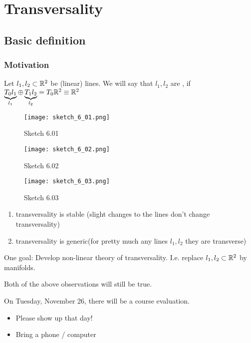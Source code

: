 \chapter{Transversality}

\section{Basic definition}

\subsection{Motivation}

Let \(l_1,l_2\subset\mathbb{R}^2\) be (linear) lines. We will say that \(l_1,l_2\) are , if 
\(\underbrace{T_0l_1}_{l_1} \oplus \underbrace{T_1l_2}_{l_2} = T_0\mathbb{R}^2\equiv \mathbb{R}^2\)
\begin{figure}[H]
    \centering
    \texttt{[image: sketch\_6\_01.png]}
    \caption{Sketch 6.01}
\end{figure}
\begin{figure}[H]
    \centering
    \texttt{[image: sketch\_6\_02.png]}
    \caption{Sketch 6.02}
\end{figure}
\begin{figure}[H]
    \centering
    \texttt{[image: sketch\_6\_03.png]}
    \caption{Sketch 6.03}
\end{figure}
\begin{enumerate}
    \item transversality is stable (slight changes to the lines don't change transversality) 
    \item transversality is generic(for pretty much any lines \(l_1,l_2\) they are transverse)
\end{enumerate}

One goal: Develop non-linear theory  of transversality. I.e. replace \(l_1,l_2\subset\mathbb{R}^2\) by manifolds.

Both of the above observations will still be true.  %



 On Tuesday, November 26, there will be a course evaluation. 

\begin{itemize}
    \item Please show up that day!
    \item Bring a phone / computer
\end{itemize}

